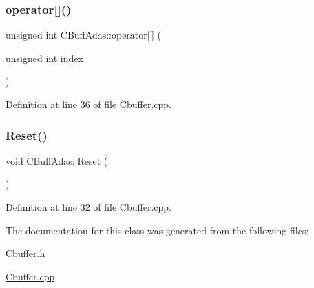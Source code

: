 \subsubsection{\texorpdfstring{operator[]()}{operator[]()}}
{\footnotesize\ttfamily unsigned int C\+Buff\+Adas\+::operator\mbox{[}$\,$\mbox{]} (\begin{DoxyParamCaption}\item[{unsigned int}]{index }\end{DoxyParamCaption})}



Definition at line 36 of file Cbuffer.\+cpp.

\mbox{\label{class_c_buff_adas_a2ff1ee5f1dfa56117d76b17027d7b7e8}} 
\subsubsection{\texorpdfstring{Reset()}{Reset()}}
{\footnotesize\ttfamily void C\+Buff\+Adas\+::\+Reset (\begin{DoxyParamCaption}{ }\end{DoxyParamCaption})}



Definition at line 32 of file Cbuffer.\+cpp.



The documentation for this class was generated from the following files\+:\begin{DoxyCompactItemize}
\item 
\mbox{\hyperlink{_cbuffer_8h}{Cbuffer.\+h}}\item 
\mbox{\hyperlink{_cbuffer_8cpp}{Cbuffer.\+cpp}}\end{DoxyCompactItemize}
